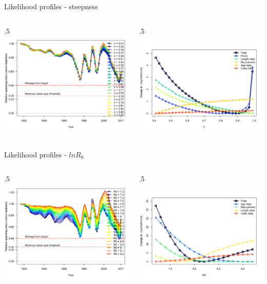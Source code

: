 \documentclass[ignorenonframetext,]{beamer}
\def\begincols{\begin{columns}}
\def\begincol{\begin{column}}
\def\endcol{\end{column}}
\def\endcols{\end{columns}}
\begin{document}
\begin{frame}{Likelihood profiles - steepness}

\begincols
 \begincol{.5\textwidth}
\includegraphics[height=5cm]{Figures/profile_h_depl.png} \endcol
 \begincol{.5\textwidth}
\includegraphics[height=5cm]{Figures/profile_h_like.png}\\
\endcol
\endcols

\end{frame}

\begin{frame}{Likelihood profiles - \(lnR_0\)}

\begincols
 \begincol{.5\textwidth}
\includegraphics[height=5cm]{Figures/profile_R0_depl.png} \endcol
 \begincol{.5\textwidth}
\includegraphics[height=5cm]{Figures/profile_R0_like.png}\\
\endcol
\endcols

\end{frame}
\end{document}

